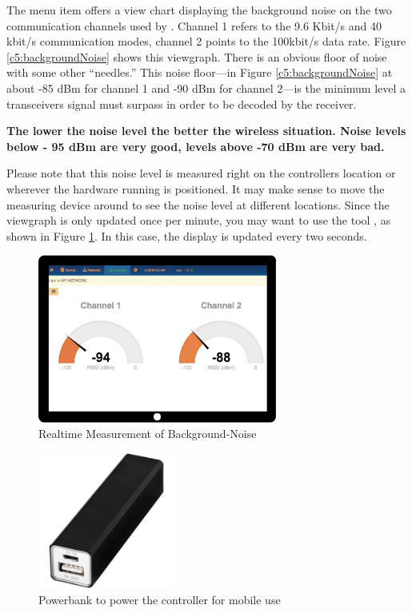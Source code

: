 The menu item  offers a view chart displaying the background 
noise on the two communication channels used by \zwave. Channel 1 refers to the 9.6 Kbit/s 
and 40 kbit/s communication modes, channel 2 points to the 100kbit/s data rate.
Figure \ref{c5:backgroundNoise} shows this viewgraph. There is an obvious floor of 
noise with some other ``needles.'' This noise floor---in Figure \ref{c5:backgroundNoise} 
at about -85 dBm for channel 1 and -90 dBm for channel 2---is the minimum level a \zwave 
transceivers signal must surpass in order to be decoded by the \zwave receiver.

\textbf{The lower the noise level the better the wireless situation.
Noise levels below - 95 dBm are very good, levels above -70 dBm are very bad.}

Please note that this noise level is measured right on the controllers location or wherever 
the hardware running \zway is positioned. It may make sense to move the measuring device around to see the 
noise level at different locations. Since the  viewgraph is 
only updated once per minute, you may want to use the tool , as 
shown in Figure \ref{c5:noisegauge}. In this case, the display is updated every two seconds.

\begin{figure}
\begin{center}
\includegraphics[width=0.7\textwidth]{pngs/cap8/c5noisegauge.png}
\caption{Realtime Measurement of Background-Noise}
\label{c5:noisegauge}
\end{center}
\end{figure}

\begin{figure}
\begin{center}
\includegraphics[width=0.4\textwidth]{pngs/cap8/powerbank.jpg}
\caption{Powerbank to power the \zway controller for mobile use}
\label{c5:powerbank}
\end{center}
\end{figure}

